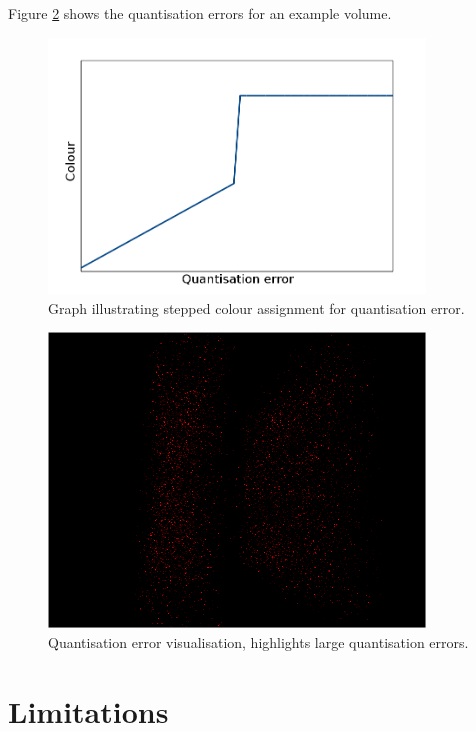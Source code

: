 Figure \ref{fig:implementation_quanterror} shows the quantisation errors for an
example volume.

\begin{figure}[h!]
  \begin{center}
    \includegraphics[width=100mm]{quant_colour_graph}
  \end{center}
  \caption{Graph illustrating stepped colour assignment for quantisation error.}
  \label{fig:implementation_quantgraph}
\end{figure}

\begin{figure}[h!]
  \begin{center}
    \includegraphics[width=100mm]{quanterror}
  \end{center}
  \caption{Quantisation error visualisation, highlights large quantisation
  errors.}
  \label{fig:implementation_quanterror}
\end{figure}



\section{Limitations}
\label{sec:implementation_limitations}

